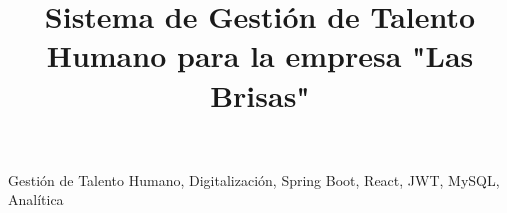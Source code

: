 \documentclass[conference]{IEEEtran}
\begin{document}
\title{Sistema de Gestión de Talento Humano para la empresa "Las Brisas"}

\author{
}

\maketitle

\begin{abstract}

\end{abstract}

\begin{IEEEkeywords}
Gestión de Talento Humano, Digitalización, Spring Boot, React, JWT, MySQL, Analítica
\end{IEEEkeywords}










\printbibliography
\end{document}
